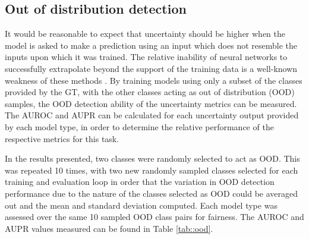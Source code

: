 \documentclass[
twocolumn,
]{ceurart}
\begin{document}
\subsection{Out of distribution detection}

It would be reasonable to expect that uncertainty should be higher when the model is asked to make a prediction using an input which does not resemble the inputs upon which it was trained.
The relative inability of neural networks to successfully extrapolate beyond the support of the training data is a well-known weakness of these methods \cite{Lakshminarayanan2017}.
By training models using only a subset of the classes provided by the GT, with the other classes acting as out of distribution (OOD) samples, the OOD detection ability of the uncertainty metrics can be measured.
The AUROC and AUPR can be calculated for each uncertainty output provided by each model type, in order to determine the relative performance of the respective metrics for this task.

In the results presented, two classes were randomly selected to act as OOD.
This was repeated 10 times, with two new randomly sampled classes selected for each training and evaluation loop in order that the variation in OOD detection performance due to the nature of the classes selected as OOD could be averaged out and the mean and standard deviation computed.
Each model type was assessed over the same 10 sampled OOD class pairs for fairness.
The AUROC and AUPR values measured can be found in Table \ref{tab::ood}.
\end{document}
